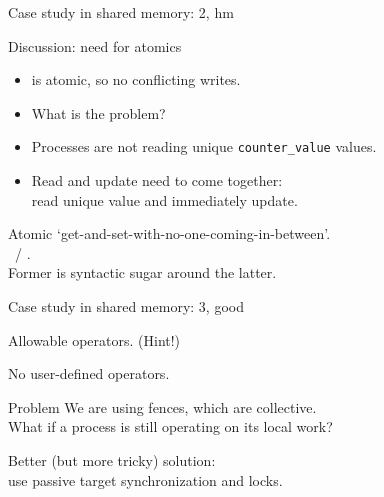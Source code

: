 \begin{numberedframe}{Case study in shared memory: 2, hm}
  \label{sl:fetchacc}
\end{numberedframe}

\begin{numberedframe}{Discussion: need for atomics}
  \label{sl:fetchop}
  \begin{itemize}
  \item {} is atomic, so no conflicting writes.
  \item What is the problem?
  \item Processes are not reading unique \lstinline+counter_value+ values.
  \item Read and update need to come together:\\
    read unique value and immediately update.
  \end{itemize}
  Atomic `get-and-set-with-no-one-coming-in-between'.\\
  ~/ .\\
  Former is syntactic sugar around the latter.
\end{numberedframe}


\begin{numberedframe}{Case study in shared memory: 3, good}
  \label{sl:fetchaccgood}
\end{numberedframe}

\begin{numberedframe}{Allowable operators. (Hint!)}
  

  No user-defined operators.
\end{numberedframe}

\begin{numberedframe}{Problem}
  We are using fences, which are collective.\\
  What if a process is still operating on its local work?

  Better (but more tricky) solution:\\
  use passive target synchronization and locks.
\end{numberedframe}

\begin{exerciseframe}[lockfetch]
  
\end{exerciseframe}

\begin{exerciseframe}[lockfetchshared]
  
\end{exerciseframe}

\endinput

\begin{numberedframe}{}
  \label{sl:}
\end{numberedframe}

\begin{optexerciseframe}
  
\end{optexerciseframe}


